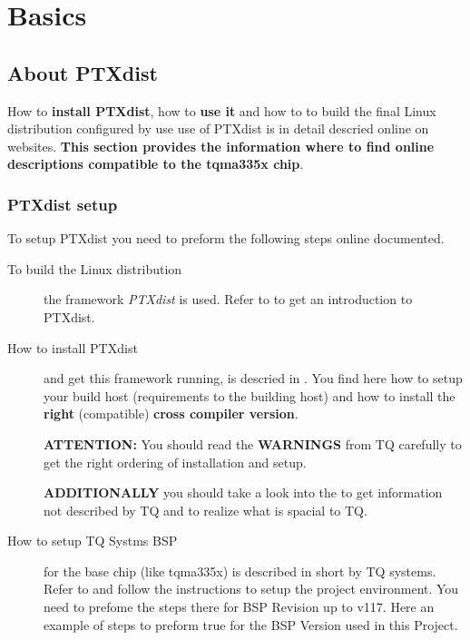 \chapter{Basics}%
\section{About PTXdist}%
\label{sec:linux_distribution_build}

How to \textbf{install PTXdist}, how to \textbf{use it} and how to to build the
final Linux distribution configured by use use of PTXdist is in detail descried
online on websites. \textbf{This section provides the information where to find
    online descriptions compatible to the tqma335x chip}.


\subsection{PTXdist setup}%
To setup PTXdist you need to preform the following steps online documented.

\begin{description}
    \item[To build the Linux distribution] the framework \textit{PTXdist} is
        used. Refer to \newline \textbf{\cite{ptxdist}} to get an introduction
        to PTXdist.
    \item[How to install PTXdist] and get this framework running, is descried in
        \textbf{\cite{tq_bsp119_install}}. You find here how to setup your
        build host (requirements to the building host) and how to install the
        \textbf{right} (compatible) \textbf{cross compiler version}.

        \textbf{ATTENTION:} You should read the \textbf{WARNINGS} from TQ
        carefully to get the right ordering of installation and setup.

        \textbf{ADDITIONALLY} you should take a look into the
        \textbf{\cite[PTXdist installation guide]{ptxdist_install} }
        to get information not described by TQ and to realize what is spacial
        to TQ.\@
    \item[How to setup TQ Systms BSP] for the base chip (like tqma335x)
        is described in short by TQ systems. Refer to
        \textbf{\cite{tq_bsp119_configuration}} and follow the instructions to
        setup the project environment. You need to prefome the steps there for
        BSP Revision up to v117. Here an example of steps to preform true for
        the BSP Version used in this Project.
\end{description}

